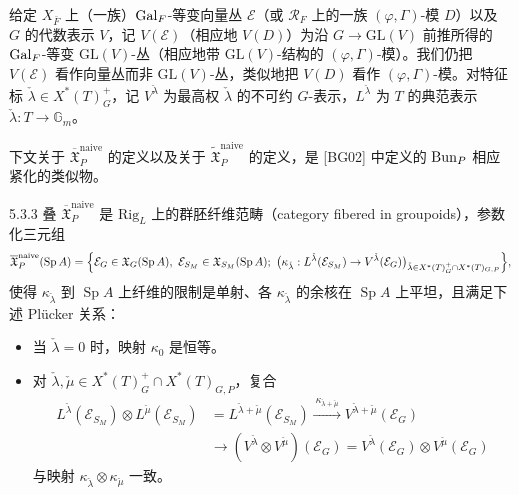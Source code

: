 给定 $X_{\bar F}$ 上（一族）$\operatorname{Gal}_F$-等变向量丛 $\mathcal{E}$（或 $\mathcal{R}_F$ 上的一族 $(\varphi,\Gamma)$-模 $D$）以及 $G$ 的代数表示 $V$，记 $V(\mathcal{E})$（相应地 $V(D)$）为沿 $G\to\mathrm{GL}(V)$ 前推所得的 $\operatorname{Gal}_F$-等变 $\mathrm{GL}(V)$-丛（相应地带 $\mathrm{GL}(V)$-结构的 $(\varphi,\Gamma)$-模）。我们仍把 $V(\mathcal{E})$ 看作向量丛而非 $\mathrm{GL}(V)$-丛，类似地把 $V(D)$ 看作 $(\varphi,\Gamma)$-模。对特征标 $\check\lambda\in X^*(T)^+_G$，记 $V^{\check\lambda}$ 为最高权 $\check\lambda$ 的不可约 $G$-表示，$L^{\check\lambda}$ 为 $T$ 的典范表示 $\check\lambda: T\to\mathbb{G}_m$。

下文关于 $\overline{\mathfrak{X}}^{\mathrm{naive}}_P$ 的定义以及关于 $\widetilde{\mathfrak{X}}^{\mathrm{naive}}_P$ 的定义，是 [BG02] 中定义的 $\operatorname{Bun}_P$ 相应紧化的类似物。

\begin{defn}{5.3.3}
叠 $\overline{\mathfrak{X}}^{\mathrm{naive}}_P$ 是 $\mathrm{Rig}_L$ 上的群胚纤维范畴（category fibered in groupoids），参数化三元组
{\small
\[
\overline{\mathfrak{X}}^{\mathrm{naive}}_P(\operatorname{Sp} A)=\Bigl\{\mathcal{E}_G\in\mathfrak{X}_G(\operatorname{Sp} A),\ \mathcal{E}_{S_M}\in\mathfrak{X}_{S_M}(\operatorname{Sp} A);\ \bigl(\kappa_{\check\lambda}: L^{\check\lambda}(\mathcal{E}_{S_M})\to V^{\check\lambda}(\mathcal{E}_G)\bigr)_{\check\lambda\in X^*(T)^+_G\cap X^*(T)_{G,P}}\Bigr\},
\]}
使得 $\kappa_{\check\lambda}$ 到 $\operatorname{Sp} A$ 上纤维的限制是单射、各 $\kappa_{\check\lambda}$ 的余核在 $\operatorname{Sp} A$ 上平坦，且满足下述 Plücker 关系：
\begin{itemize}[leftmargin=2.2em,itemsep=0.3em]
\item 当 $\check\lambda=0$ 时，映射 $\kappa_0$ 是恒等。
\item 对 $\check\lambda,\check\mu\in X^*(T)^+_G\cap X^*(T)_{G,P}$，复合
\[
\begin{aligned}
L^{\check\lambda}(\mathcal{E}_{S_M})\otimes L^{\check\mu}(\mathcal{E}_{S_M})
&=L^{\check\lambda+\check\mu}(\mathcal{E}_{S_M})\xrightarrow{\ \kappa_{\check\lambda+\check\mu}\ }V^{\check\lambda+\check\mu}(\mathcal{E}_G)\\
&\longrightarrow(V^{\check\lambda}\otimes V^{\check\mu})(\mathcal{E}_G)=V^{\check\lambda}(\mathcal{E}_G)\otimes V^{\check\mu}(\mathcal{E}_G)
\end{aligned}
\]
与映射 $\kappa_{\check\lambda}\otimes\kappa_{\check\mu}$ 一致。
\end{itemize}
\label{thm:a4-5-3-3}
\end{defn}

